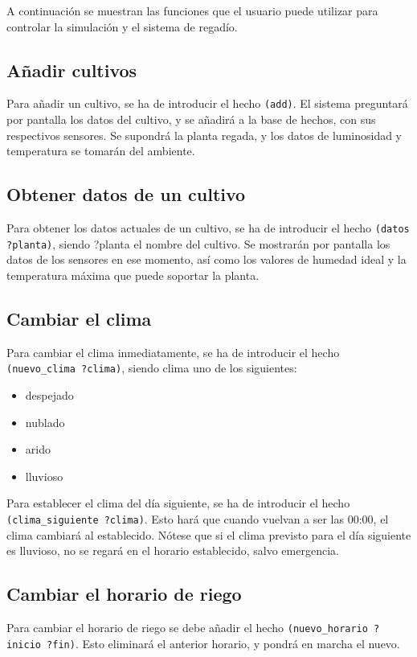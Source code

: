 \documentclass[11pt,a4paper]{article}
\begin{document}
A continuación se muestran las funciones que el usuario puede utilizar para controlar la simulación y el sistema de regadío.

\subsection*{Añadir cultivos}
Para añadir un cultivo, se ha de introducir el hecho \texttt{(add)}. El sistema preguntará por pantalla los datos del cultivo, y se añadirá a la base de hechos, con sus respectivos sensores. Se supondrá la planta regada, y los datos de luminosidad y temperatura se tomarán del ambiente.

\subsection*{Obtener datos de un cultivo}
Para obtener los datos actuales de un cultivo, se ha de introducir el hecho \texttt{(datos ?planta)}, siendo ?planta el nombre del cultivo.
Se mostrarán por pantalla los datos de los sensores en ese momento, así como los valores de humedad ideal y la temperatura máxima que puede soportar la planta.

\subsection*{Cambiar el clima}
Para cambiar el clima inmediatamente, se ha de introducir el hecho \texttt{(nuevo\_clima ?clima)}, siendo clima uno de los siguientes:

\begin{itemize}
\item despejado
\item nublado
\item arido
\item lluvioso
\end{itemize}

\medskip

Para establecer el clima del día siguiente, se ha de introducir el hecho \texttt{(clima\_siguiente ?clima)}. Esto hará que cuando vuelvan a ser las 00:00, el clima cambiará al establecido. Nótese que si el clima previsto para el día siguiente es lluvioso, no se regará en el horario establecido, salvo emergencia.

\subsection*{Cambiar el horario de riego}
Para cambiar el horario de riego se debe añadir el hecho \texttt{(nuevo\_horario ?inicio ?fin)}. Esto eliminará el anterior horario, y pondrá en marcha el nuevo.
\end{document}
